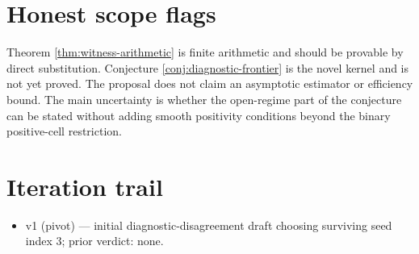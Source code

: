 \documentclass[11pt]{article}
\theoremstyle{definition}
\theoremstyle{plain}
\theoremstyle{remark}
\begin{document}
\section{Honest scope flags}
Theorem \ref{thm:witness-arithmetic} is finite arithmetic and should be
provable by direct substitution. Conjecture \ref{conj:diagnostic-frontier} is
the novel kernel and is not yet proved. The proposal does not claim an
asymptotic estimator or efficiency bound. The main uncertainty is whether the
open-regime part of the conjecture can be stated without adding smooth
positivity conditions beyond the binary positive-cell restriction.

\section{Iteration trail}
\begin{itemize}[leftmargin=*]
\item v1 (pivot) --- initial diagnostic-disagreement draft choosing surviving seed index 3; prior verdict: none.
\end{itemize}
\end{document}
